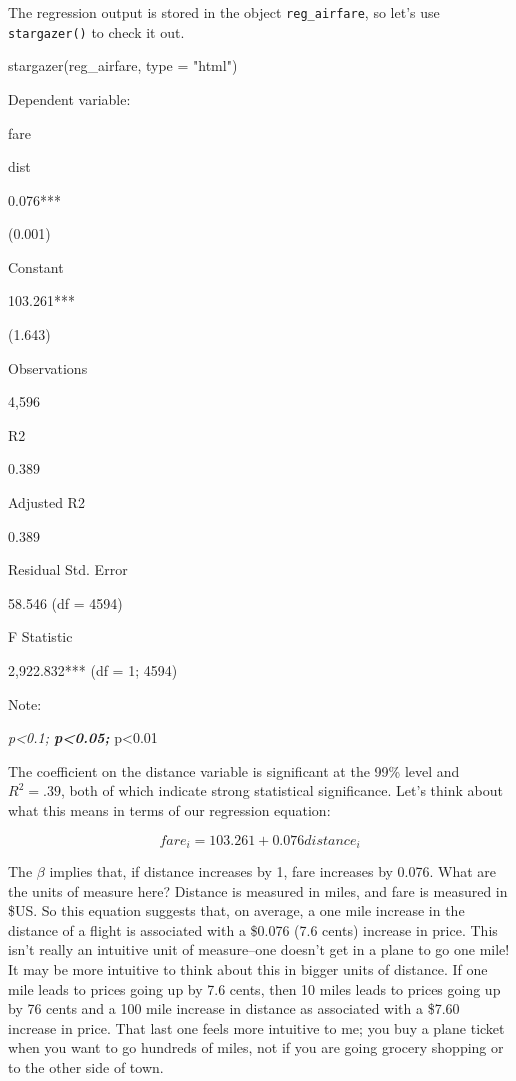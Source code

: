 \documentclass[
  letterpaper,
]{book}
\newenvironment{Shaded}{\begin{snugshade}}{\end{snugshade}}
\newcommand{\AttributeTok}[1]{\textcolor[rgb]{0.40,0.45,0.13}{#1}}
\newcommand{\FunctionTok}[1]{\textcolor[rgb]{0.28,0.35,0.67}{#1}}
\newcommand{\NormalTok}[1]{\textcolor[rgb]{0.00,0.23,0.31}{#1}}
\newcommand{\StringTok}[1]{\textcolor[rgb]{0.13,0.47,0.30}{#1}}
\begin{document}
The regression output is stored in the object \texttt{reg\_airfare}, so
let's use \texttt{stargazer()} to check it out.

\begin{Shaded}
\begin{Highlighting}[]
\FunctionTok{stargazer}\NormalTok{(reg\_airfare, }\AttributeTok{type =} \StringTok{"html"}\NormalTok{)}
\end{Highlighting}
\end{Shaded}

Dependent variable:

fare

dist

0.076***

(0.001)

Constant

103.261***

(1.643)

Observations

4,596

R2

0.389

Adjusted R2

0.389

Residual Std. Error

58.546 (df = 4594)

F Statistic

2,922.832*** (df = 1; 4594)

Note:

\emph{p\textless0.1; \textbf{p\textless0.05; }}p\textless0.01

The coefficient on the distance variable is significant at the 99\%
level and \(R^2 = .39\), both of which indicate strong statistical
significance. Let's think about what this means in terms of our
regression equation:

\begin{equation}
fare_{i} = 103.261 + 0.076 distance_{i} 
\end{equation}

The \(\beta\) implies that, if distance increases by 1, fare increases
by 0.076. What are the units of measure here? Distance is measured in
miles, and fare is measured in \$US. So this equation suggests that, on
average, a one mile increase in the distance of a flight is associated
with a \$0.076 (7.6 cents) increase in price. This isn't really an
intuitive unit of measure--one doesn't get in a plane to go one mile! It
may be more intuitive to think about this in bigger units of distance.
If one mile leads to prices going up by 7.6 cents, then 10 miles leads
to prices going up by 76 cents and a 100 mile increase in distance as
associated with a \$7.60 increase in price. That last one feels more
intuitive to me; you buy a plane ticket when you want to go hundreds of
miles, not if you are going grocery shopping or to the other side of
town.
\end{document}
